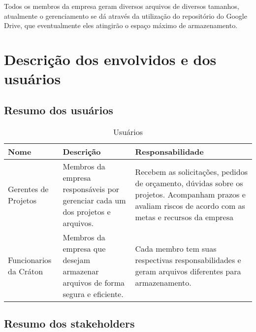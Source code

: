   Todos os membros da empresa geram diversos arquivos de diversos tamanhos, atualmente o gerenciamento se dá através da utilização do
  repositório do Google Drive, que eventualmente eles atingirão o espaço máximo de armazenamento.

\section{Descrição dos envolvidos e dos usuários}

\subsection{Resumo dos usuários}

  \begin{table}[!htb]
    \centering
    \begin{tabular}{p{}p{6cm}p{6cm}} \hline
      \rowcolor{gray!50}
        \textbf{Nome}           & \textbf{Descrição} & \textbf{Responsabilidade}                                                          \\
      \hline
        Gerentes de Projetos    & Membros da empresa responsáveis por gerenciar cada
                                  um dos projetos e arquivos.                         & Recebem as solicitações, pedidos de orçamento,
                                                                                        dúvidas sobre os projetos. Acompanham prazos e
                                                                                        avaliam riscos de acordo com as metas e recursos
                                                                                        da empresa                                        \\
        Funcionarios da Cráton  & Membros da empresa que desejam armazenar arquivos
                                  de forma segura e eficiente.                        & Cada membro tem suas respectivas responsabilidades
                                                                                        e geram arquivos diferentes para armazenamento.
    \end{tabular}
    \caption{Usuários}
  \end{table}

\subsection{Resumo dos stakeholders}

